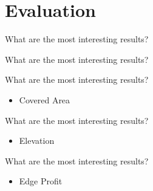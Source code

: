 \documentclass[aspectratio=169,xcolor=dvipsnames, t]{beamer}
\begin{document}
	
	\section{Evaluation}
	\begin{frame}
		\vspace{0.25cm}
		\Large{What are the most interesting results?}\normalsize
		\vspace{0.25cm}
		
		\centering
		
	\end{frame}
	
	\begin{frame}
		\vspace{0.25cm}
		\Large{What are the most interesting results?}\normalsize
		\vspace{0.25cm}
		
		\centering
		
	\end{frame}
	
	
	\begin{frame}
		\vspace{0.25cm}
		\Large{What are the most interesting results?}\normalsize
		\vspace{0.25cm}
		\begin{itemize}
			\item Covered Area
		\end{itemize}
		
		\centering
		
	\end{frame}
	
	\begin{frame}
		\vspace{0.25cm}
		\Large{What are the most interesting results?}\normalsize
		\vspace{0.25cm}
		\begin{itemize}
			\item Elevation
		\end{itemize}
		
		\centering
		
	\end{frame}
	
	\begin{frame}
		\vspace{0.25cm}
		\Large{What are the most interesting results?}\normalsize
		\vspace{0.25cm}
		\begin{itemize}
			\item Edge Profit
		\end{itemize}
		
		\centering
		
	\end{frame}
	
\end{document}
